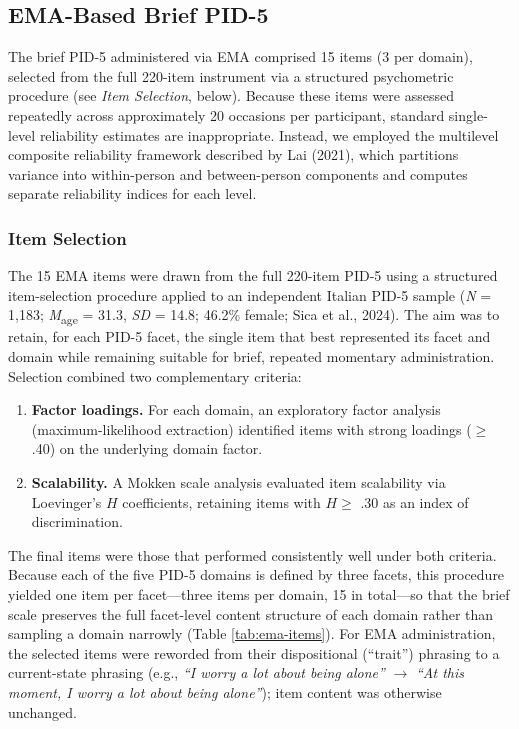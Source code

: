 \documentclass[
  english,
  man,floatsintext]{apa6}
\begin{document}
\subsection{EMA-Based Brief PID-5}\label{ema-based-brief-pid-5}

The brief PID-5 administered via EMA comprised 15 items (3 per domain), selected from the full 220-item instrument via a structured psychometric procedure (see \emph{Item Selection}, below). Because these items were assessed repeatedly across approximately 20 occasions per participant, standard single-level reliability estimates are inappropriate. Instead, we employed the multilevel composite reliability framework described by Lai (2021), which partitions variance into within-person and between-person components and computes separate reliability indices for each level.

\subsubsection{Item Selection}\label{item-selection}

The 15 EMA items were drawn from the full 220-item PID-5 using a structured item-selection procedure applied to an independent Italian PID-5 sample (\emph{N} = 1,183; \emph{M}\textsubscript{age} = 31.3, \emph{SD} = 14.8; 46.2\% female; Sica et al., 2024). The aim was to retain, for each PID-5 facet, the single item that best represented its facet and domain while remaining suitable for brief, repeated momentary administration. Selection combined two complementary criteria:

\begin{enumerate}
\def\labelenumi{\arabic{enumi}.}
\item
  \textbf{Factor loadings.} For each domain, an exploratory factor analysis (maximum-likelihood extraction) identified items with strong loadings (\(\geq\) .40) on the underlying domain factor.
\item
  \textbf{Scalability.} A Mokken scale analysis evaluated item scalability via Loevinger's \(H\) coefficients, retaining items with \(H \geq\) .30 as an index of discrimination.
\end{enumerate}

The final items were those that performed consistently well under both criteria. Because each of the five PID-5 domains is defined by three facets, this procedure yielded one item per facet---three items per domain, 15 in total---so that the brief scale preserves the full facet-level content structure of each domain rather than sampling a domain narrowly (Table \ref{tab:ema-items}). For EMA administration, the selected items were reworded from their dispositional (``trait'') phrasing to a current-state phrasing (e.g., \emph{``I worry a lot about being alone''} \(\rightarrow\) \emph{``At this moment, I worry a lot about being alone''}); item content was otherwise unchanged.
\end{document}
